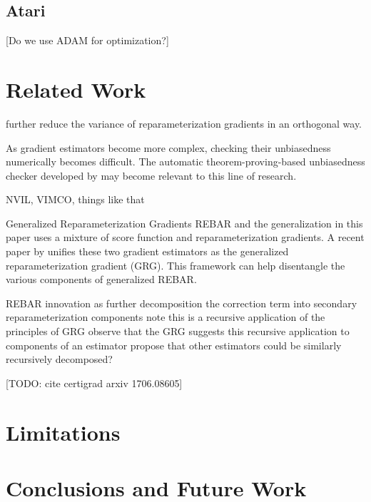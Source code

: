 \documentclass{article}
\begin{document}
\subsection{Atari}

\citet{mnih-dqn-2015}

[Do we use ADAM \citep{kingma2015adam} for optimization?]





\section{Related Work}
\label{related work}

\citet{miller2017reducing} further reduce the variance of reparameterization gradients in an orthogonal way.

As gradient estimators become more complex, checking their unbiasedness numerically becomes difficult.
The automatic theorem-proving-based unbiasedness checker developed by \citet{selsam2017developing} may become relevant to this line of research.

NVIL, VIMCO, things like that

\par{Generalized Reparameterization Gradients}
REBAR and the generalization in this paper uses a mixture of score function and reparameterization gradients.
A recent paper by \cite{ruiz2016generalized} unifies these two gradient estimators as the generalized reparameterization gradient (GRG).
This framework can help disentangle the various components of generalized REBAR.

REBAR innovation as further decomposition the correction term into secondary reparameterization components
note this is a recursive application of the principles of GRG
observe that the GRG suggests this recursive application to components of an estimator
propose that other estimators could be similarly recursively decomposed?


[TODO: cite certigrad arxiv 1706.08605]



\section{Limitations}
\label{limitation}

\section{Conclusions and Future Work}
\label{conclusion}
\end{document}
